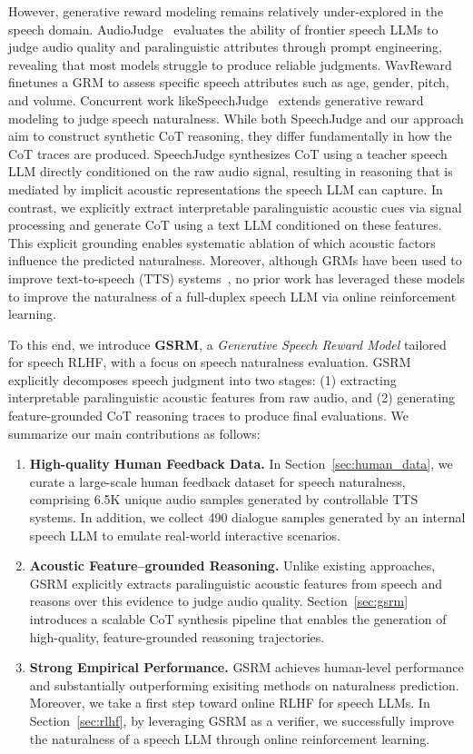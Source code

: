 However, generative reward modeling remains relatively under-explored in the speech domain. AudioJudge~\cite{manakul2025audiojudge} evaluates the ability of frontier speech LLMs to judge audio quality and paralinguistic attributes through prompt engineering, revealing that most models struggle to produce reliable judgments. WavReward~\cite{ji2025wavreward} finetunes a GRM to assess specific speech attributes such as age, gender, pitch, and volume. Concurrent work likeSpeechJudge~\cite{zhang2025speechjudge} extends generative reward modeling to judge speech naturalness. While both SpeechJudge and our approach aim to construct synthetic CoT reasoning, they differ fundamentally in how the CoT traces are produced. SpeechJudge synthesizes CoT using a teacher speech LLM directly conditioned on the raw audio signal, resulting in reasoning that is mediated by implicit acoustic representations the speech LLM can capture. In contrast, we explicitly extract interpretable paralinguistic acoustic cues via signal processing and generate CoT using a text LLM conditioned on these features. This explicit grounding enables systematic ablation of which acoustic factors influence the predicted naturalness.  Moreover, although GRMs have been used to improve text-to-speech (TTS) systems~\cite{zhang2025speechjudge}, no prior work has leveraged these models to improve the naturalness of a full-duplex speech LLM via online reinforcement learning.

To this end, we introduce \textbf{GSRM}, a \emph{Generative Speech Reward Model} tailored for speech RLHF, with a focus on speech naturalness evaluation. GSRM explicitly decomposes speech judgment into two stages: (1) extracting interpretable paralinguistic acoustic features from raw audio, and (2) generating feature-grounded CoT reasoning traces to produce final evaluations. We summarize our main contributions as follows:
\begin{enumerate}[leftmargin=*]
    \item \textbf{High-quality Human Feedback Data.} In Section~\ref{sec:human_data}, we curate a large-scale human feedback dataset for speech naturalness, comprising 6.5K unique audio samples generated by controllable TTS systems. In addition, we collect 490 dialogue samples generated by an internal speech LLM to emulate real-world interactive scenarios.

    \item \textbf{Acoustic Feature–grounded Reasoning.} Unlike existing approaches, GSRM explicitly extracts paralinguistic acoustic features from speech and reasons over this evidence to judge audio quality. Section~\ref{sec:gsrm} introduces a scalable CoT synthesis pipeline that enables the generation of high-quality, feature-grounded reasoning trajectories.

    \item \textbf{Strong Empirical Performance.} 
    GSRM achieves human-level performance and
    substantially outperforming exisiting methods on naturalness prediction. Moreover, we take a first step toward online RLHF for speech LLMs. In Section~\ref{sec:rlhf}, by leveraging GSRM as a verifier, we successfully improve the naturalness of a speech LLM through online reinforcement learning.
\end{enumerate}
